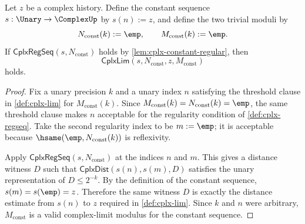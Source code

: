 \begin{theorem}
\label{thm:cplx-constant-sequence-constant-limit}
Let $z$ be a complex history. Define the constant sequence $s:\Unary\to\ComplexUp$ by $s(n):=z$, and define the two trivial moduli by
$$
N_{\mathrm{const}}(k):=\emp,
\qquad
M_{\mathrm{const}}(k):=\emp.
$$
If $\mathsf{CplxRegSeq}(s,N_{\mathrm{const}})$ holds by \autoref{lem:cplx-constant-regular}, then
$$
\mathsf{CplxLim}(s,N_{\mathrm{const}},z,M_{\mathrm{const}})
$$
holds.
\end{theorem}
\begin{proof}
Fix a unary precision $k$ and a unary index $n$ satisfying the threshold clause in \autoref{def:cplx-lim} for $M_{\mathrm{const}}(k)$. Since $M_{\mathrm{const}}(k)=N_{\mathrm{const}}(k)=\emp$, the same threshold clause makes $n$ acceptable for the regularity condition of \autoref{def:cplx-regseq}. Take the second regularity index to be $m:=\emp$; it is acceptable because $\hsame(\emp,N_{\mathrm{const}}(k))$ is reflexivity.

Apply $\mathsf{CplxRegSeq}(s,N_{\mathrm{const}})$ at the indices $n$ and $m$. This gives a distance witness $D$ such that $\mathsf{CplxDist}(s(n),s(m),D)$ satisfies the unary representation of $D\leq 2^{-k}$. By the definition of the constant sequence, $s(m)=s(\emp)=z$. Therefore the same witness $D$ is exactly the distance estimate from $s(n)$ to $z$ required in \autoref{def:cplx-lim}. Since $k$ and $n$ were arbitrary, $M_{\mathrm{const}}$ is a valid complex-limit modulus for the constant sequence.
\end{proof}

